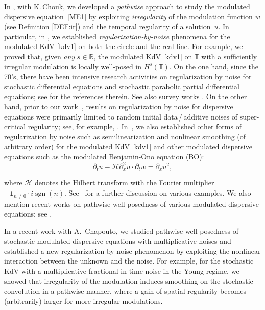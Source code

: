 \documentclass[letterpaper, 11pt,  reqno]{amsart}
\DeclareMathOperator{\sgn}{sgn}
\newcommand{\1}{\hspace{0.5mm}\text{I}\hspace{0.5mm}}
\newcommand{\noi}{\noindent}
\newcommand{\T}{\mathbb{T}}
\renewcommand{\H}{\mathcal{H}}
\newcommand{\dx}{\partial_x}
\newcommand{\dt}{\partial_t}
\newcommand{\ind}{\mathbf 1}
\numberwithin{equation}{section}
\numberwithin{theorem}{section}
\begin{document}
In \cite{CG1, CGLLO1},  
 with K.\,Chouk, we  
 developed 
  a {\it pathwise} approach 
to study the modulated dispersive equation~\eqref{ME1}
by exploiting {\it irregularity} of the modulation function $w$
(see Definition \ref{DEF:ir})
and  the temporal regularity of a solution~$u$.
In particular, 
in \cite{CGLLO1}, 
we established 
{\it regularization-by-noise}
phenomena for the   modulated 
KdV \eqref{kdv1}
 on both the circle and the real line.
For example, 
we proved that, given {\it any} $s \in \mathbb R$, the modulated KdV \eqref{kdv1} on $\T$ with a sufficiently irregular modulation is locally well-posed in $H^s(\T)$. 
On the one hand, since the 70's, 
there have been intensive research activities
on regularization by noise 
for stochastic differential equations
and stochastic parabolic partial differential equations;
see
 \cite{
GP, 
KR, 
 FGP, GG0, G22, RT, CGLLO1,
 ABLL} for the  references therein.
See also   survey works \cite{Flan, Gess}.
On the other hand, 
prior to our work~\cite{CGLLO1}, 
results on regularization by noise 
for  dispersive equations
were primarily limited to random initial data\,/\,additive noises of super-critical regularity;
see, for example, 
\cite{BO96, BT08, CO, BT3, BOP2, Poc, OP, 
GKO2, DNY2, DNY3, OOT1, Bring, OOT2, BDNY}.
In~\cite{CGLLO1}, 
we also established 
other forms of regularization by noise
such as 
semilinearization and nonlinear smoothing
(of arbitrary order)
for the modulated KdV \eqref{kdv1}
and other modulated dispersive equations
such as the modulated Benjamin-Ono equation (BO):
\begin{equation}
\label{BO}
\dt u-    \H\dx^2 u \cdot \dt w=\dx u^2,
\end{equation}

\noi
where $\H$ denotes the
Hilbert transform
with the Fourier multiplier $- \ind_{n\ne 0}\cdot i \sgn (n)$.
See~\cite{CGLLO1}
for a further discussion on various examples.
We also mention 
recent works
\cite{Tanaka, Robert1, Robert2, Robert3, Robert4, GGLO}
on pathwise well-posedness of  various modulated dispersive equations;
see \cite[Remark~1.14]{CGLLO1}.

In a recent work \cite{CGLLO2} with A.~Chapouto, we studied
pathwise well-posedness of stochastic modulated dispersive equations
with multiplicative noises
and established a new 
regularization-by-noise phenomenon by exploiting the nonlinear interaction between the unknown and the noise.
For example, 
for 
the stochastic KdV with 
a multiplicative fractional-in-time noise in the Young regime, 
we showed that 
irregularity of the modulation induces
smoothing on the stochastic convolution
in a pathwise manner, 
where 
a gain of spatial regularity  becomes (arbitrarily) larger for more irregular modulations.
\end{document}
